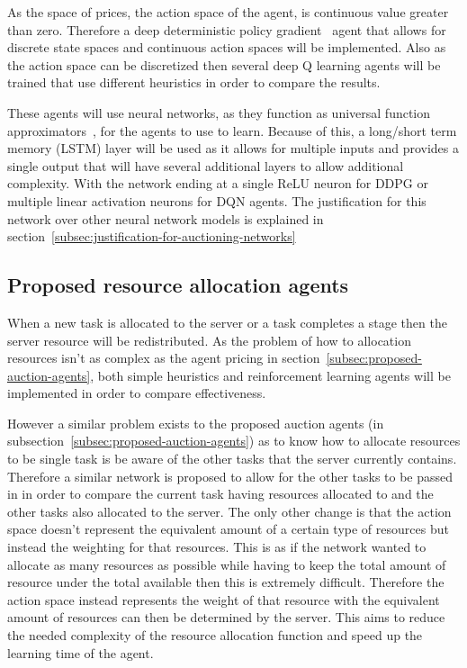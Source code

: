 As the space of prices, the action space of the agent, is continuous value greater than zero. Therefore a
deep deterministic policy gradient~\citep{ddpg} agent that allows for discrete state spaces and continuous action spaces
will be implemented. Also as the action space can be discretized then several deep Q learning agents will be trained
that use different heuristics in order to compare the results.

These agents will use neural networks, as they function as universal function
approximators~\citep{csaji2001approximation}, for the agents to use to learn. Because of this, a long/short term
memory (LSTM) layer will be used as it allows for multiple inputs and provides a single output that will have
several additional layers to allow additional complexity. With the network ending at a single ReLU neuron for DDPG
or multiple linear activation neurons for DQN agents. The justification for this network over other neural network
models is explained in section~\ref{subsec:justification-for-auctioning-networks}

\subsection{Proposed resource allocation agents}\label{subsec:proposed-resource-allocation-agents}
When a new task is allocated to the server or a task completes a stage then the server resource will be redistributed.
As the problem of how to allocation resources isn't as complex as the agent pricing in
section~\ref{subsec:proposed-auction-agents}, both simple heuristics and reinforcement learning agents will be
implemented in order to compare effectiveness.

However a similar problem exists to the proposed auction agents (in subsection~\ref{subsec:proposed-auction-agents}) as
to know how to allocate resources to be single task is be aware of the other tasks that the server currently contains.
Therefore a similar network is proposed to allow for the other tasks to be passed in in order to compare the current
task having resources allocated to and the other tasks also allocated to the server. The only other change is that
the action space doesn't represent the equivalent amount of a certain type of resources but instead the weighting
for that resources. This is as if the network wanted to allocate as many resources as possible while having to keep
the total amount of resource under the total available then this is extremely difficult. Therefore the action space
instead represents the weight of that resource with the equivalent amount of resources can then be determined by the
server. This aims to reduce the needed complexity of the resource allocation function and speed up the learning time
of the agent.